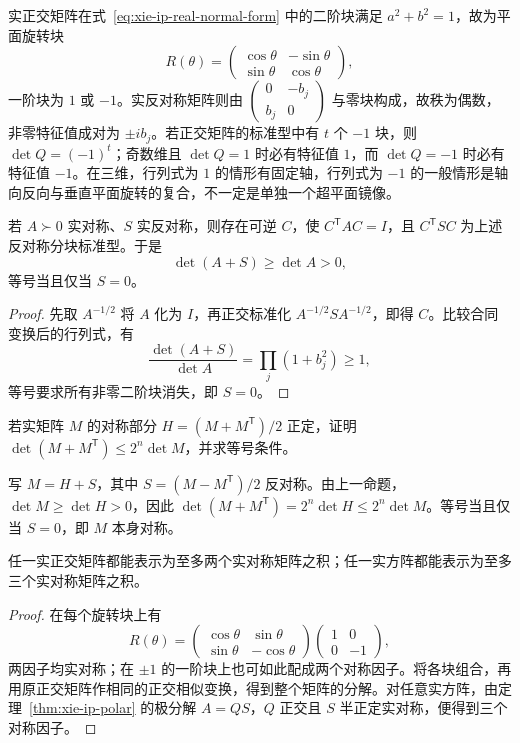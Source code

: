 实正交矩阵在式~\eqref{eq:xie-ip-real-normal-form} 中的二阶块满足 $a^2+b^2=1$，故为平面旋转块
\[
R(\theta)=\begin{pmatrix}\cos\theta&-\sin\theta\\\sin\theta&\cos\theta\end{pmatrix},
\]
一阶块为 $1$ 或 $-1$。实反对称矩阵则由 $\begin{pmatrix}0&-b_j\\b_j&0\end{pmatrix}$ 与零块构成，故秩为偶数，非零特征值成对为 $\pm ib_j$。若正交矩阵的标准型中有 $t$ 个 $-1$ 块，则 $\det Q=(-1)^t$；奇数维且 $\det Q=1$ 时必有特征值 $1$，而 $\det Q=-1$ 时必有特征值 $-1$。在三维，行列式为 $1$ 的情形有固定轴，行列式为 $-1$ 的一般情形是轴向反向与垂直平面旋转的复合，不一定是单独一个超平面镜像。

\begin{proposition}
若 $A\succ0$ 实对称、$S$ 实反对称，则存在可逆 $C$，使 $C^{\mathsf T}AC=I$，且 $C^{\mathsf T}SC$ 为上述反对称分块标准型。于是
\[
\det(A+S)\geq\det A>0,
\]
等号当且仅当 $S=0$。
\end{proposition}
\begin{proof}
先取 $A^{-1/2}$ 将 $A$ 化为 $I$，再正交标准化 $A^{-1/2}SA^{-1/2}$，即得 $C$。比较合同变换后的行列式，有
\[
\frac{\det(A+S)}{\det A}=\prod_j(1+b_j^2)\geq1,
\]
等号要求所有非零二阶块消失，即 $S=0$。
\end{proof}

\begin{example}
若实矩阵 $M$ 的对称部分 $H=(M+M^{\mathsf T})/2$ 正定，证明 $\det(M+M^{\mathsf T})\leq2^n\det M$，并求等号条件。
\end{example}
\begin{solve}
写 $M=H+S$，其中 $S=(M-M^{\mathsf T})/2$ 反对称。由上一命题，$\det M\geq\det H>0$，因此 $\det(M+M^{\mathsf T})=2^n\det H\leq2^n\det M$。等号当且仅当 $S=0$，即 $M$ 本身对称。
\end{solve}

\begin{proposition}
任一实正交矩阵都能表示为至多两个实对称矩阵之积；任一实方阵都能表示为至多三个实对称矩阵之积。
\end{proposition}
\begin{proof}
在每个旋转块上有
\[
R(\theta)=
\begin{pmatrix}\cos\theta&\sin\theta\\\sin\theta&-\cos\theta\end{pmatrix}
\begin{pmatrix}1&0\\0&-1\end{pmatrix},
\]
两因子均实对称；在 $\pm1$ 的一阶块上也可如此配成两个对称因子。将各块组合，再用原正交矩阵作相同的正交相似变换，得到整个矩阵的分解。对任意实方阵，由定理~\ref{thm:xie-ip-polar} 的极分解 $A=QS$，$Q$ 正交且 $S$ 半正定实对称，便得到三个对称因子。
\end{proof}

